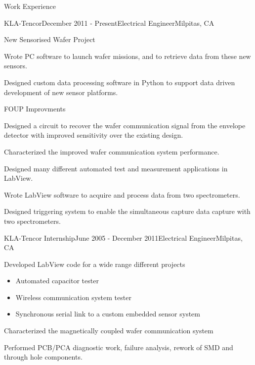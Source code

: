 \documentclass{resume} %
\begin{document}
\begin{rSection}{Work Experience}
\begin{rSubsection}{KLA-Tencor}{December 2011 - Present}{Electrical Engineer}{Milpitas, CA}
\begin{rWorkProject}{New Sensorised Wafer Project}
\item Wrote PC software to launch wafer missions, and to retrieve data from these new sensors.
\item Designed custom data processing software in Python to support data driven development of new sensor platforms.
\end{rWorkProject}

\begin{rWorkProject}{FOUP Improvments}
\item Designed a circuit to recover the wafer communication signal from the envelope detector with improved sensitivity over the existing design.
\item Characterized the improved wafer communication system performance.
\end{rWorkProject}

\smallskip
\item Designed many different automated test and measurement applications in LabView.
\item Wrote LabView software to acquire and process data from two spectrometers.
\item Designed triggering system to enable the simultaneous capture data capture with two spectrometers.
\end{rSubsection}


\begin{rSubsection}{KLA-Tencor Internship}{June 2005 - December 2011}{Electrical Engineer}{Milpitas, CA}
\item Developed LabView code for a wide range different projects
\begin{itemize}
\itemsep -0.5em \vspace{-0.5em}
\renewcommand{\labelitemi}{-}
\item Automated capacitor tester
\item Wireless communication system tester
\item Synchronous serial link to a custom embedded sensor system
\end{itemize}
\item Characterized the magnetically coupled wafer communication system
\item Performed PCB/PCA diagnostic work, failure analysis, rework of SMD and through hole components.
\end{rSubsection}

\end{rSection}
\end{document}
